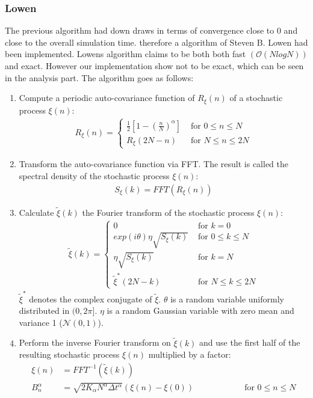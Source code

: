 \documentclass[
  a4paper,BCOR10mm,oneside,
  bibtotoc,idxtotoc,
  headsepline,footsepline,%
  fleqn,openbib
]{scrbook}
\begin{document}
\subsubsection{Lowen}
The previous algorithm had down draws in terms of convergence close to 0 and close to the overall simulation time. therefore a algorithm of Steven B. Lowen \cite{Lowen1999} had been implemented. Lowens algorithm claims to be both both fast $(\mathcal{O}(NlogN))$ and exact. However our implementation show not to be exact, which can be seen in the analysis part. The algorithm goes as follows:
\begin{enumerate}
 \item Compute a periodic auto-covariance function of $R_{\xi}(n)$ of a stochastic process $\xi(n)$:
 \begin{align}
  R_{\xi}(n)=
  \begin{cases}
   \frac{1}{2}\left[1-\left(\frac{n}{N}\right)^{\alpha} \right]  & \text{ for    } 0 \leq n \leq N \\
   R_{\xi}(2N-n)  & \text{ for    } N \leq n \leq 2N 
  \end{cases}
 \end{align}
 \item Transform the auto-covariance function via FFT. The result is called the spectral density of the stochastic process $\xi(n)$:
  \begin{align}
   S_{\xi}(k)= FFT(R_{\xi}(n))
  \end{align}
 \item Calculate $\tilde\xi(k)$ the Fourier transform of the stochastic process $\xi(n)$:
 \begin{align}
  \tilde\xi(k)=
  \begin{cases}
     0  & \text{ for    } k=0 \\    
     exp(i \theta) \eta \sqrt{S_{\xi}(k)}  & \text{ for    } 0 \leq k \leq N \\
     \eta \sqrt{S_{\xi}(k)}  & \text{ for    } k = N \\
     \tilde\xi^{*}(2N-k) & \text{ for    } N \leq k \leq 2N 
  \end{cases}
 \end{align}
 $\tilde\xi^{*}$ denotes the complex conjugate of $\tilde\xi$. $\theta$ is a random variable uniformly distributed  in $(0,2\pi]$. $\eta$ is a random Gaussian variable with zero mean and variance 1 ($\mathcal{N}(0,1)$).  
 \item Perform the inverse Fourier transform on $\tilde\xi(k)$ and use the first half of the resulting stochastic process $\xi(n)$ multiplied by a factor:
 \begin{align}
  \xi(n)&=FFT^{-1}(\tilde\xi(k)) \\
  B^{\alpha}_n&=  \sqrt{2 K_{\alpha} N^{\alpha} \Delta t^{\alpha}} (\xi(n)- \xi(0)) \qquad \qquad \qquad \text{for    } 0 \leq n \leq N
 \end{align}
\end{enumerate}
\end{document}
